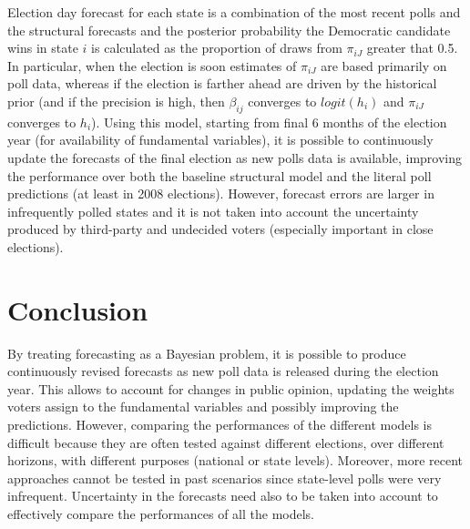 \documentclass[
  12pt]{article}
\begin{document}
Election day forecast for each state is a combination of the most recent
polls and the structural forecasts and the posterior probability the
Democratic candidate wins in state \(i\) is calculated as the proportion
of draws from \(\pi_{iJ}\) greater that 0.5. In particular, when the
election is soon estimates of \(\pi_{iJ}\) are based primarily on poll
data, whereas if the election is farther ahead are driven by the
historical prior (and if the precision is high, then \(\beta_{ij}\)
converges to \(logit(h_i)\) and \(\pi_{iJ}\) converges to \(h_i\)).
Using this model, starting from final 6 months of the election year (for
availability of fundamental variables), it is possible to continuously
update the forecasts of the final election as new polls data is
available, improving the performance over both the baseline structural
model and the literal poll predictions (at least in 2008 elections).
However, forecast errors are larger in infrequently polled states and it
is not taken into account the uncertainty produced by third-party and
undecided voters (especially important in close elections).

\hypertarget{sec-conc}{%
\section{Conclusion}\label{sec-conc}}

By treating forecasting as a Bayesian problem, it is possible to produce
continuously revised forecasts as new poll data is released during the
election year. This allows to account for changes in public opinion,
updating the weights voters assign to the fundamental variables and
possibly improving the predictions. However, comparing the performances
of the different models is difficult because they are often tested
against different elections, over different horizons, with different
purposes (national or state levels). Moreover, more recent approaches
cannot be tested in past scenarios since state-level polls were very
infrequent. Uncertainty in the forecasts need also to be taken into
account to effectively compare the performances of all the models.
\end{document}
